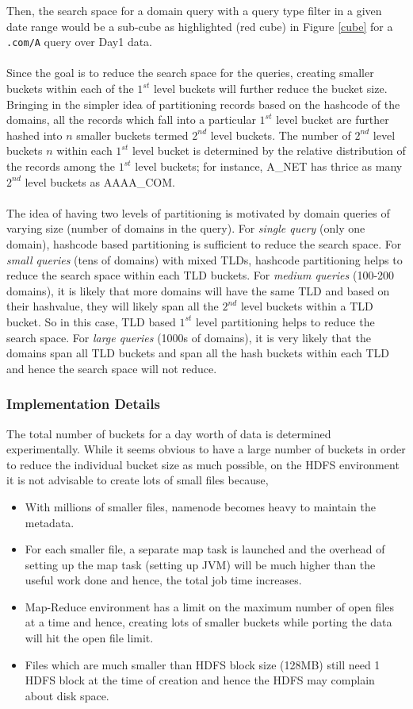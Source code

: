 \documentclass[11pt,a4paper]{article}
\newcommand{\resitem}[1]{\item #1 \vspace{-7pt}}
\begin{document}
\noindent
Then, the search space for a domain query with a query type filter in a given date range would be a sub-cube as highlighted (red cube) in Figure \ref{cube} for a \texttt{.com/A} query over Day1 data.
\\\\
Since the goal is to reduce the search space for the queries, creating smaller buckets within each of the $1^{st}$ level buckets will further reduce the bucket size. Bringing in the simpler idea of partitioning records based on the hashcode of the domains, all the records which fall into a particular $1^{st}$ level bucket are further hashed into $n$ smaller buckets termed $2^{nd}$ level buckets. The number of $2^{nd}$ level buckets $n$ within each $1^{st}$ level bucket is determined by the relative distribution of the records among the $1^{st}$ level buckets; for instance, A\_NET has thrice as many $2^{nd}$ level buckets as AAAA\_COM.
\\\\
The idea of having two levels of partitioning is motivated by domain queries of varying size (number of domains in the query). For \textit{single query} (only one domain), hashcode based partitioning is sufficient to reduce the search space. For \textit{small queries} (tens of domains) with mixed TLDs, hashcode partitioning helps to reduce the search space within each TLD buckets. For \textit{medium queries} (100-200 domains), it is likely that more domains will have the same TLD and based on their hashvalue, they will likely span all the $2^{nd}$ level buckets within a TLD bucket. So in this case, TLD based $1^{st}$ level partitioning helps to reduce the search space. For \textit{large queries} (1000s of domains), it is very likely that the domains span all TLD buckets and span all the hash buckets within each TLD and hence the search space will not reduce.

\subsubsection{Implementation Details}
The total number of buckets for a day worth of data is determined experimentally. While it seems obvious to have a large number of buckets in order to reduce the individual bucket size as much possible, on the HDFS environment it is not advisable to create lots of small files because,
\begin{itemize}
    \item {With millions of smaller files, namenode becomes heavy to maintain the metadata.}
    \resitem {For each smaller file, a separate map task is launched and the overhead of setting up the map task (setting up JVM) will be much higher than the useful work done and hence, the total job time increases.}
    \resitem {Map-Reduce environment has a limit on the maximum number of open files at a time and hence, creating lots of smaller buckets while porting the data will hit the open file limit.}
    \resitem {Files which are much smaller than HDFS block size (128MB) still need 1 HDFS block at the time of creation and hence the HDFS may complain about disk space.}
\end{itemize}
\end{document}
